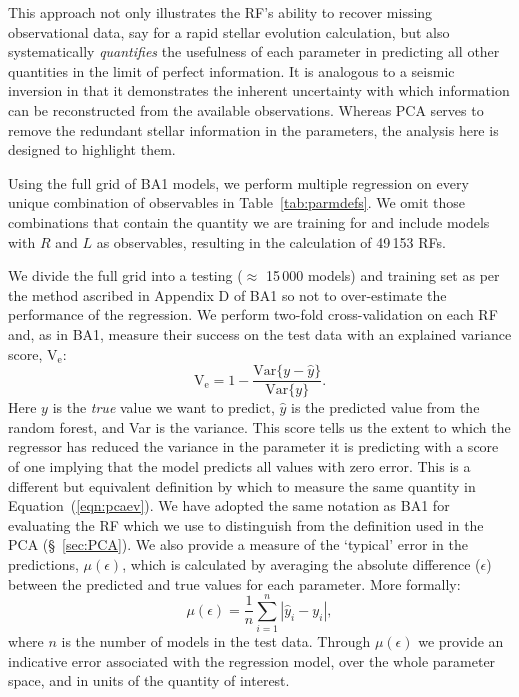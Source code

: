  This approach not only illustrates the RF's ability to recover missing observational data, say for a rapid stellar evolution calculation, but also systematically \emph{quantifies} the usefulness of each parameter in predicting all other quantities in the limit of perfect information. It is analogous to a seismic inversion in that it demonstrates the inherent uncertainty with which information can be reconstructed from the available observations. 
Whereas PCA serves to remove the redundant stellar information in the parameters, the analysis here is designed to highlight them. 

Using the full grid of BA1 models, we perform multiple regression on every unique combination of observables in Table~\ref{tab:parmdefs}. We omit those combinations that contain the quantity we are training for and include models with $R$ and $L$ as observables, resulting in the calculation of 49\,153 RFs. 


We divide the full grid into a testing ($\approx$ 15\,000 models) and training set as per the method ascribed in Appendix D of BA1 so not to over-estimate the performance of the regression. 
We perform two-fold cross-validation on each RF and, as in BA1, measure their success on the test data with an explained variance score, V$_{\text{e}}$:
\begin{equation}
\label{eqn:ve}
  \text{V}_{\text{e}} = 1 - \frac{\text{Var}\{ y - \hat y \}}{\text{Var}\{ y \}}.
\end{equation}
Here $y$ is the \emph{true} value we want to predict, $\hat{y}$ is the predicted value from the random forest, and Var is the variance. This score tells us the extent to which the regressor has reduced the variance in the parameter it is predicting with a score of one implying that the model predicts all values with zero error. This is a different but equivalent definition by which to measure the same quantity in Equation~(\ref{eqn:pcaev}). We have adopted the same notation as BA1 for evaluating the RF which we use to distinguish from the definition used in the PCA (\S~\ref{sec:PCA}). We also provide a measure of the `typical' error in the predictions, $\mu (\epsilon)$,  which is calculated by averaging the absolute difference ($\epsilon$) between the predicted and true values for each parameter. More formally: 
\begin{equation}
\label{eqn:mu}
    \mu (\epsilon) = \frac{1}{n} \sum^n_{i=1} | \hat y_i - y_i |,
\end{equation}
where $n$ is the number of models in the test data. Through $\mu (\epsilon)$  we provide an indicative error associated with the regression model, over the whole parameter space, and  in units of the quantity of interest.  

